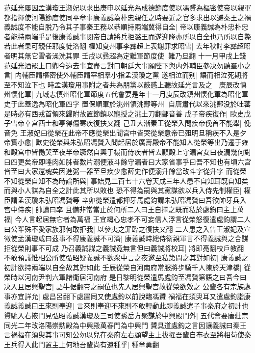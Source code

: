 范延光屢因孟漢瓊王淑妃以求出庚申以延光為成德節度使以馮贇為樞密使帝以親軍都指揮使河陽節度使同平章事康義誠為朴忠親任之時要近之官多求出以避秦王之禍義誠度不能自脱乃令其子事秦王務以恭順持兩端冀得自全|{
	帝以康義誠為朴忠朴忠者能持兩端乎是後康義誠事閔帝自請將兵拒潞王而遂迎降亦所以自全也乃所以自斃若此者果可親任耶度徒洛翻}
權知夏州事李彞超上表謝罪求昭雪|{
	去年秋討李彞超昭者明其無它雪者澡洗其罪}
壬戌以彞超為定難軍節度使|{
	難乃旦翻}
十一月甲戌上錢范延光酒罷上曰卿今遠去事宜盡言對曰朝廷大事願陛下與内外輔臣參决勿聽羣小之言|{
	内輔臣謂樞密使外輔臣謂宰相羣小指孟漢瓊之黨}
遂相泣而别|{
	語而相泣死期將至不知泣下也}
時孟漢瓊用事附之者共為朋黨以蔽惑上聽故延光言及之　庚辰改慎州懷化軍|{
	九域志慎州昭化軍節度五代會要是年十一月庚辰改鎮州懷化軍為昭化軍史于此蓋逸為昭化軍四字}
置保順軍於洮州領洮鄯等州|{
	自唐肅代以來洮鄯没於吐蕃是時必有西戎首領來歸附故置節鎮以寵授之洮土刀翻鄯音善}
戊子帝疾復作|{
	歐史戊子雪帝幸宫西士和亭得傷寒疾復扶又翻}
己丑大漸秦王從榮入問疾帝俛首不能舉|{
	俛音免}
王淑妃曰從榮在此帝不應從榮出聞宫中皆哭從榮意帝已殂明旦稱疾不入是夕帝實小愈|{
	歐史從榮與朱弘昭馮贇入問起居於廣壽殿帝不能知人從榮等出乃遷于雍和殿宫中皆慟哭至夜半帝蹶然自興于榻而侍疾者皆去顧殿上守漏宫女曰夜漏幾何對曰四更矣帝即唾肉如胏者數片溺便液斗餘守漏者曰大家省事乎曰吾不知也有頃六宫皆至曰大家還魂矣因進粥一器至旦疾少愈薛史作便溺升餘當改斗字從升字}
而從榮不知從榮自知不為時論所與|{
	事始見二百七十六卷天成三年人患不自知耳既自知矣而與小人謀為自全之計此其所以敗也}
恐不得為嗣與其黨謀欲以兵入侍先制權臣|{
	權臣謂孟漢瓊朱弘昭馮贇等}
辛卯從榮遣都押牙馬處鈞謂朱弘昭馮贇曰吾欲帥牙兵入宫中侍疾|{
	帥讀曰率}
且備非常當止於何所二人曰王自擇之既而私於處鈞曰主上萬福|{
	今人言起居無它者為萬福}
王宜竭心忠孝不可妄信人浮言從榮怒復遣處鈞謂二人曰公輩殊不愛家族邪何敢拒我|{
	以參夷之罪臨之復扶又翻}
二人患之入告王淑妃及宣徽使孟漢瓊咸曰茲事不得康義誠不可濟|{
	康義誠時總侍衛親軍言不得義誠與之合謀拒從榮則事不可成}
乃召義誠謀之義誠竟無言但曰義誠將校耳|{
	將即亮翻校戶教翻}
不敢預議惟相公所使弘昭疑義誠不欲衆中言之夜邀至私第問之其對如初|{
	康義誠之初計欲持兩端以自全故其對如此}
壬辰從榮自河南府常服將步騎千人陳於天津橋|{
	從榮時以河南尹判六軍諸衛居河南府}
是日黎明從榮遣馬處鈞至馮贇第語之曰吾今曰决入且居興聖宫|{
	語牛倨翻帝之嗣位也先入居興聖宫故從榮欲效之}
公輩各有宗族處事亦宜詳允|{
	處昌呂翻下處置同又使處鈞以前說臨馮贇}
禍福在須臾耳又遣處鈞詣康義誠義誠曰王來則奉迎|{
	言來則奉迎不來則不敢輕動此即義誠遣子事秦府之初計也}
贇馳入右掖門見弘昭義誠漢瓊及三司使孫岳方聚謀於中興殿門外|{
	五代會要唐莊宗同光二年改洛陽崇勲殿為中興殿萬春門為中興門}
贇具道處鈞之言因讓義誠曰秦王言禍福在須臾其事可知公勿以兒在秦府左右顧望主上拔擢吾輩自布衣至將相苟使秦王兵得入此門置主上何地吾輩尚有遺種乎|{
	種章勇翻}
